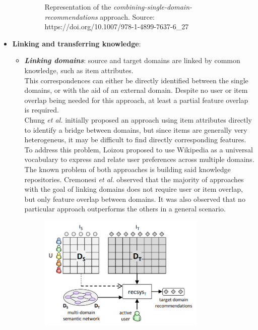 \begin{itemize}
\begin{itemize}
\begin{figure}[hbt!]
  \caption{Representation of the \textit{combining-single-domain-recommendations} approach. Source: https://doi.org/10.1007/978-1-4899-7637-6\_27}
\end{figure}
\end{itemize}
\item \textbf{Linking and transferring knowledge}:
\begin{itemize}
\item \textbf{\textit{Linking domains}}: source and target domains are linked by common knowledge, such as item attributes.\\
This correspondences can either be directly identified between the single domains, or with the aid of an external domain. Despite no user or item overlap being needed for this approach, at least a partial feature overlap is required.\\
Chung \textit{et al.} \cite{10.1145/1282100.1282113} initially proposed an approach using item attributes directly to identify a bridge between domains, but since items are generally very heterogeneus, it may be difficult to find directly corresponding features. To address this problem, Loizou \cite{crossdomain-recsys-categorization} proposed to use Wikipedia as a universal vocabulary to express and relate user preferences across multiple domains.\\
The known problem of both approaches is building said knowledge repositories. Cremonesi \textit{et al.} \cite{10.1007/978-1-4899-7637-6_27} observed that the majority of approaches with the goal of linking domains does not require user or item overlap, but only feature overlap between domains. It was also observed that no particular approach outperforms the others in a general scenario.
\begin{figure}[hbt!]
  \centering
  \includegraphics[width=0.8\textwidth]{pictures/linking-domains}

\end{figure}
\end{itemize}
\end{itemize}
